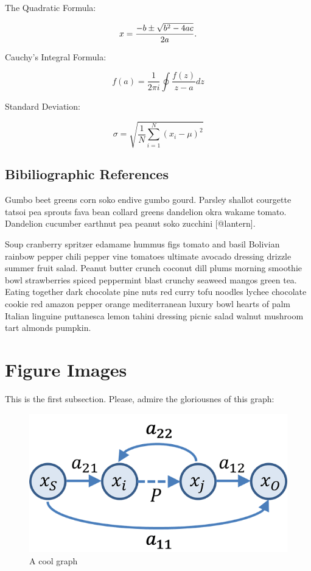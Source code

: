 \documentclass[
  11pt,
,
onecolumn,
openany
]{book}
\begin{document}
The Quadratic Formula:

\[x = {-b \pm \sqrt{b^2-4ac} \over 2a}.\]

Cauchy's Integral Formula:

\[f(a) = \frac{1}{2\pi i} \oint\frac{f(z)}{z-a}dz\]

Standard Deviation:

\[\sigma = \sqrt{ \frac{1}{N} \sum_{i=1}^N (x_i -\mu)^2}\]

\hypertarget{bibiliographic-references}{%
\subsection{Bibiliographic References}\label{bibiliographic-references}}

Gumbo beet greens corn soko endive gumbo gourd. Parsley shallot courgette
tatsoi pea sprouts fava bean collard greens dandelion okra wakame tomato.
Dandelion cucumber earthnut pea peanut soko zucchini {[}@lantern{]}.

Soup cranberry spritzer edamame hummus figs tomato and basil Bolivian rainbow
pepper chili pepper vine tomatoes ultimate avocado dressing drizzle summer
fruit salad. Peanut butter crunch coconut dill plums morning smoothie bowl
strawberries spiced peppermint blast crunchy seaweed mangos green tea. Eating
together dark chocolate pine nuts red curry tofu noodles lychee chocolate
cookie red amazon pepper orange mediterranean luxury bowl hearts of palm
Italian linguine puttanesca lemon tahini dressing picnic salad walnut mushroom
tart almonds pumpkin.

\hypertarget{figure-images}{%
\section{Figure Images}\label{figure-images}}

This is the first subsection. Please, admire the gloriousnes of this graph:

\begin{figure}
\hypertarget{fig:graph}{%
\centering
\includegraphics{graph.png}
\caption{A cool graph}\label{fig:graph}
}
\end{figure}
\end{document}
